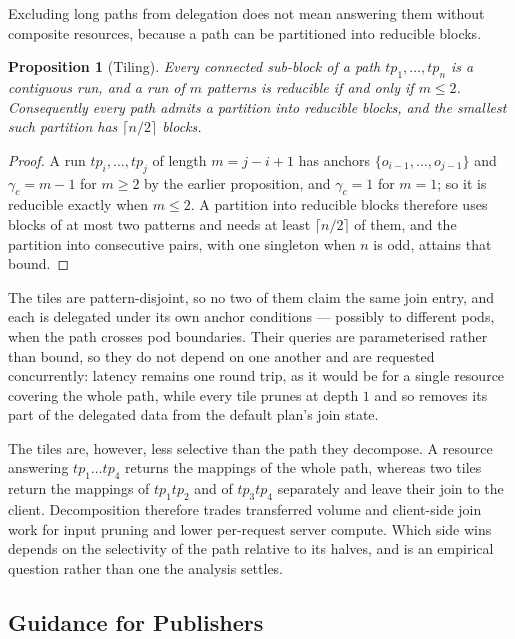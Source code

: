 \documentclass{article}
\newtheorem{proposition}{Proposition}
\begin{document}
Excluding long paths from delegation does not mean answering them without composite
resources, because a path can be partitioned into reducible blocks.

\begin{proposition}[Tiling]
Every connected sub-block of a path $tp_1, \dots, tp_n$ is a contiguous run, and a run of
$m$ patterns is reducible if and only if $m \leq 2$. Consequently every path admits a
partition into reducible blocks, and the smallest such partition has $\lceil n/2 \rceil$
blocks.
\end{proposition}

\begin{proof}
A run $tp_i, \dots, tp_j$ of length $m = j - i + 1$ has anchors
$\{o_{i-1}, \dots, o_{j-1}\}$ and $\gamma_c = m - 1$ for $m \geq 2$ by the earlier
proposition, and $\gamma_c = 1$ for $m = 1$; so it is reducible exactly when $m \leq 2$.
A partition into reducible blocks therefore uses blocks of at most two patterns and needs
at least $\lceil n/2 \rceil$ of them, and the partition into consecutive pairs, with one
singleton when $n$ is odd, attains that bound.
\end{proof}

The tiles are pattern-disjoint, so no two of them claim the same join entry, and each is
delegated under its own anchor conditions --- possibly to different pods, when the path
crosses pod boundaries. Their queries are parameterised rather than bound, so they do not
depend on one another and are requested concurrently: latency remains one round trip, as
it would be for a single resource covering the whole path, while every tile prunes at
depth $1$ and so removes its part of the delegated data from the default plan's join
state.

The tiles are, however, less selective than the path they decompose. A resource answering
$tp_1 \dots tp_4$ returns the mappings of the whole path, whereas two tiles return the
mappings of $tp_1 tp_2$ and of $tp_3 tp_4$ separately and leave their join to the client.
Decomposition therefore trades transferred volume and client-side join work for input
pruning and lower per-request server compute. Which side wins depends on the selectivity
of the path relative to its halves, and is an empirical question rather than one the
analysis settles.

\subsection{Guidance for Publishers}
\end{document}
